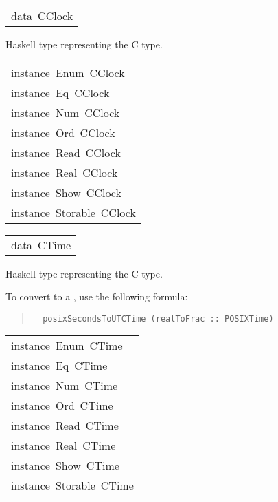 \begin{haddockdesc}
\item[\begin{tabular}{@{}l}
data\ CClock
\end{tabular}]\haddockbegindoc
Haskell type representing the C  type.
\par

\end{haddockdesc}
\begin{haddockdesc}
\item[\begin{tabular}{@{}l}
instance\ Enum\ CClock\\instance\ Eq\ CClock\\instance\ Num\ CClock\\instance\ Ord\ CClock\\instance\ Read\ CClock\\instance\ Real\ CClock\\instance\ Show\ CClock\\instance\ Storable\ CClock
\end{tabular}]
\end{haddockdesc}
\begin{haddockdesc}
\item[\begin{tabular}{@{}l}
data\ CTime
\end{tabular}]\haddockbegindoc
Haskell type representing the C  type.
\par
To convert to a , use the following formula:
\par
\begin{quote}
{\haddockverb\begin{verbatim}
  posixSecondsToUTCTime (realToFrac :: POSIXTime)
\end{verbatim}}
\end{quote}

\end{haddockdesc}
\begin{haddockdesc}
\item[\begin{tabular}{@{}l}
instance\ Enum\ CTime\\instance\ Eq\ CTime\\instance\ Num\ CTime\\instance\ Ord\ CTime\\instance\ Read\ CTime\\instance\ Real\ CTime\\instance\ Show\ CTime\\instance\ Storable\ CTime
\end{tabular}]
\end{haddockdesc}
